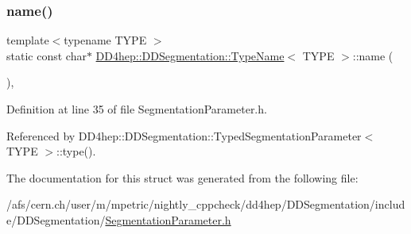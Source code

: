 \subsubsection{\texorpdfstring{name()}{name()}}
{\footnotesize\ttfamily template$<$typename T\+Y\+PE $>$ \\
static const char$\ast$ \hyperlink{struct_d_d4hep_1_1_d_d_segmentation_1_1_type_name}{D\+D4hep\+::\+D\+D\+Segmentation\+::\+Type\+Name}$<$ T\+Y\+PE $>$\+::name (\begin{DoxyParamCaption}{ }\end{DoxyParamCaption})\hspace{0.3cm}{\ttfamily [inline]}, {\ttfamily [static]}}



Definition at line 35 of file Segmentation\+Parameter.\+h.



Referenced by D\+D4hep\+::\+D\+D\+Segmentation\+::\+Typed\+Segmentation\+Parameter$<$ T\+Y\+P\+E $>$\+::type().



The documentation for this struct was generated from the following file\+:\begin{DoxyCompactItemize}
\item 
/afs/cern.\+ch/user/m/mpetric/nightly\+\_\+cppcheck/dd4hep/\+D\+D\+Segmentation/include/\+D\+D\+Segmentation/\hyperlink{_segmentation_parameter_8h}{Segmentation\+Parameter.\+h}\end{DoxyCompactItemize}
